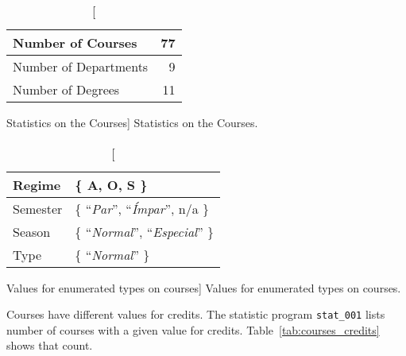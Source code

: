 \begin{table}[h!]
    \centering

    \begin{tabular}{| l | r |}
        \hline
        Number of Courses     & 77 \\ \hline
        Number of Departments & 9  \\ \hline
        Number of Degrees     & 11 \\ \hline
    \end{tabular}

    \caption
        [Statistics on the Courses]
        {Statistics on the Courses.}

    \label{tab:courses_stats}
\end{table}

\begin{table}[h!]
    \centering

    \begin{tabular}{| l | l |}
        \hline
        Regime   & \{ A, O, S \}                                    \\ \hline
        Semester & \{ ``\textit{Par}'', ``\textit{Ímpar}'', n/a \}  \\ \hline
        Season   & \{ ``\textit{Normal}'', ``\textit{Especial}'' \} \\ \hline
        Type     & \{ ``\textit{Normal}'' \}                        \\ \hline
    \end{tabular}

    \caption
        [Values for enumerated types on courses]
        {Values for enumerated types on courses.}

    \label{tab:courses_enum}
\end{table}

Courses have different values for credits. The statistic program
\texttt{stat\_001} lists number of courses with a given value for credits.
Table~\ref{tab:courses_credits} shows that count.

